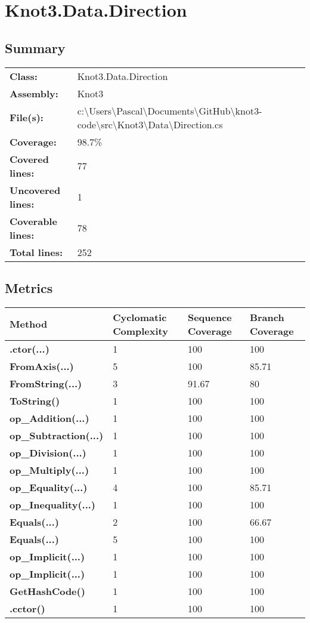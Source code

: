 \documentclass[a4paper,10pt]{article}
\begin{document}
\section{Knot3.Data.Direction}
\subsection{Summary}
\begin{longtable}[l]{ll}
\textbf{Class:} & Knot3.Data.Direction\\
\textbf{Assembly:} & Knot3\\
\textbf{File(s):} & \begin{minipage}[t]{12cm}{c:\textbackslash Users\textbackslash Pascal\textbackslash Documents\textbackslash GitHub\textbackslash knot3-code\textbackslash src\textbackslash Knot3\textbackslash Data\textbackslash Direction.cs}\end{minipage} \\
\textbf{Coverage:} & 98.7\%\\
\textbf{Covered lines:} & 77\\
\textbf{Uncovered lines:} & 1\\
\textbf{Coverable lines:} & 78\\
\textbf{Total lines:} & 252\\
\end{longtable}
\subsection{Metrics}
\begin{longtable}[l]{|l|l|l|l|}
\hline
\textbf{Method} & \textbf{Cyclomatic Complexity} & \textbf{Sequence Coverage} & \textbf{Branch Coverage}\\
\hline
\textbf{.ctor(...)} & 1 & 100 & 100\\
\hline
\textbf{FromAxis(...)} & 5 & 100 & 85.71\\
\hline
\textbf{FromString(...)} & 3 & 91.67 & 80\\
\hline
\textbf{ToString()} & 1 & 100 & 100\\
\hline
\textbf{op\_Addition(...)} & 1 & 100 & 100\\
\hline
\textbf{op\_Subtraction(...)} & 1 & 100 & 100\\
\hline
\textbf{op\_Division(...)} & 1 & 100 & 100\\
\hline
\textbf{op\_Multiply(...)} & 1 & 100 & 100\\
\hline
\textbf{op\_Equality(...)} & 4 & 100 & 85.71\\
\hline
\textbf{op\_Inequality(...)} & 1 & 100 & 100\\
\hline
\textbf{Equals(...)} & 2 & 100 & 66.67\\
\hline
\textbf{Equals(...)} & 5 & 100 & 100\\
\hline
\textbf{op\_Implicit(...)} & 1 & 100 & 100\\
\hline
\textbf{op\_Implicit(...)} & 1 & 100 & 100\\
\hline
\textbf{GetHashCode()} & 1 & 100 & 100\\
\hline
\textbf{.cctor()} & 1 & 100 & 100\\
\hline
\end{longtable}
\end{document}
